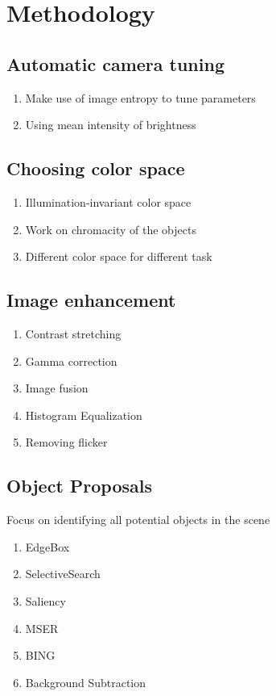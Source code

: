 \section{Methodology}

\subsection{Automatic camera tuning}

\begin{enumerate}
    \item Make use of image entropy to tune parameters
    \item Using mean intensity of brightness
\end{enumerate}

\subsection{Choosing color space}

\begin{enumerate}
    \item Illumination-invariant color space
    \item Work on chromacity of the objects 
    \item Different color space for different task
\end{enumerate}

\subsection{Image enhancement}

\begin{enumerate}
    \item Contrast stretching
    \item Gamma correction 
    \item Image fusion 
    \item Histogram Equalization 
    \item Removing flicker
\end{enumerate}

\subsection{Object Proposals}
Focus on identifying all potential objects in the scene

\begin{enumerate}
    \item EdgeBox
    \item SelectiveSearch
    \item Saliency
    \item MSER
    \item BING
    \item Background Subtraction
\end{enumerate}

